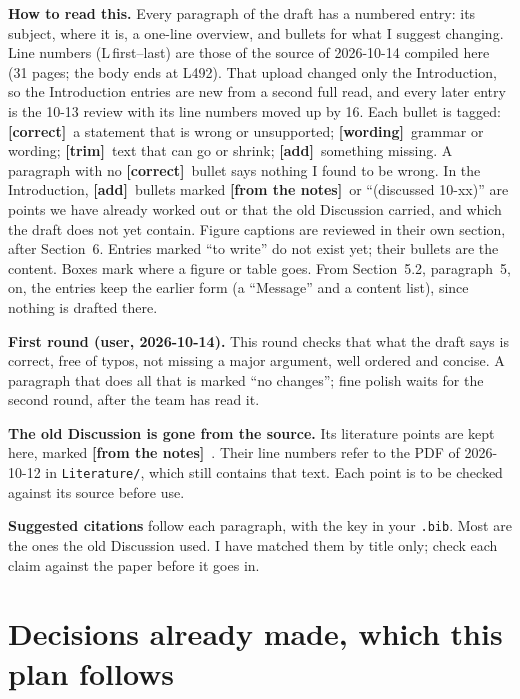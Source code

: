 \documentclass[11pt]{article}
\newcommand{\Note}{\textcolor{open}{\textbf{[from the notes]}}\ }
\newcommand{\tC}{\textcolor{miss}{\textbf{[correct]}}\ }
\newcommand{\tG}{\textcolor{stale}{\textbf{[wording]}}\ }
\newcommand{\tT}{\textcolor{cut}{\textbf{[trim]}}\ }
\newcommand{\tA}{\textcolor{have}{\textbf{[add]}}\ }
\begin{document}
\textbf{How to read this.} Every paragraph of the draft has a numbered
entry: its subject, where it is, a one-line overview, and bullets for what I
suggest changing. Line numbers (L\,first--last) are those of the source of
2026-10-14 compiled here (31 pages; the body ends at L492). That upload
changed only the Introduction, so the Introduction entries are new from a
second full read, and every later entry is the 10-13 review with its line
numbers moved up by 16. Each bullet is tagged:
\tC a statement that is wrong or unsupported;
\tG grammar or wording;
\tT text that can go or shrink;
\tA something missing.
A paragraph with no \tC bullet says nothing I found to be wrong. In the
Introduction, \tA bullets marked \Note or ``(discussed 10-xx)'' are points we
have already worked out or that the old Discussion carried, and which the
draft does not yet contain. Figure captions are reviewed in their own
section, after Section~6. Entries
marked ``to write'' do not exist yet; their bullets are the content. Boxes
mark where a figure or table goes. From Section~5.2, paragraph~5, on, the
entries keep the earlier form (a ``Message'' and a content list), since
nothing is drafted there.

\textbf{First round (user, 2026-10-14).} This round checks that what the
draft says is correct, free of typos, not missing a major argument, well
ordered and concise. A paragraph that does all that is marked ``no changes'';
fine polish waits for the second round, after the team has read it.

\textbf{The old Discussion is gone from the source.} Its literature points
are kept here, marked \Note. Their line numbers refer to the PDF of
2026-10-12 in \texttt{Literature/}, which still contains that text. Each
point is to be checked against its source before use.

\textbf{Suggested citations} follow each paragraph, with the key in your
\texttt{.bib}. Most are the ones the old Discussion used. I have matched them
by title only; check each claim against the paper before it goes in.

\section*{Decisions already made, which this plan follows}
\end{document}
